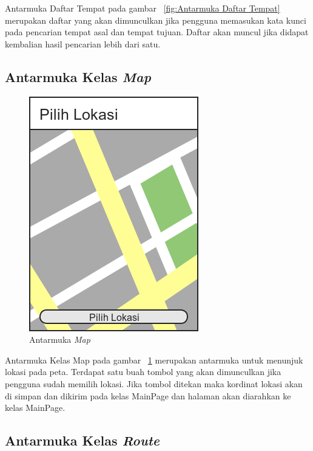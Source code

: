 \hspace{0.5cm} Antarmuka Daftar Tempat pada gambar ~\ref{fig:Antarmuka Daftar Tempat} merupakan daftar yang akan dimunculkan jika pengguna memasukan kata kunci pada pencarian tempat asal dan tempat tujuan. Daftar akan muncul jika didapat kembalian hasil pencarian lebih dari satu.

\subsection{Antarmuka Kelas \textit{Map}}
\label{lab:Antarmuka Kelas Map}

\begin{figure}[h]
	\centering
		\includegraphics[scale=0.6]{Gambar/perancangan_antarmuka/Map}
	\caption{Antarmuka \textit{Map}}
	\label{fig:Antarmuka Map}
\end{figure}

\hspace{0.5cm} Antarmuka Kelas Map pada gambar ~\ref{fig:Antarmuka Map} merupakan antarmuka untuk menunjuk lokasi pada peta. Terdapat satu buah tombol yang akan dimunculkan jika pengguna sudah memilih lokasi. Jika tombol ditekan maka kordinat lokasi akan di simpan dan dikirim pada kelas MainPage dan halaman akan diarahkan ke kelas MainPage.

\subsection{Antarmuka Kelas \textit{Route}}
\label{lab:Antarmuka Kelas Route}

